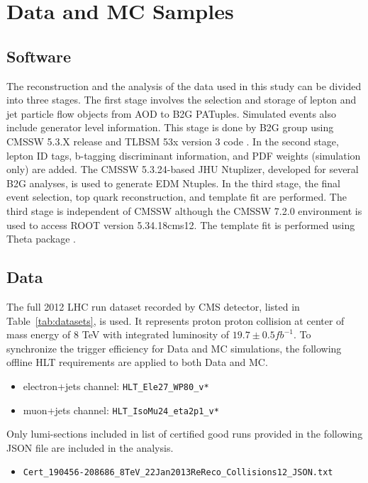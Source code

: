 \section{Data and MC Samples}
\label{sec:samples}

\subsection{Software}
The reconstruction and the analysis of the data used in this study can be divided into three stages.  The first stage involves the selection and storage of lepton and jet particle flow objects from AOD to B2G PATuples.  Simulated events also include generator level information.  This stage is done by B2G group using CMSSW 5.3.X release and TLBSM 53x version 3 code \cite{B2G_twiki}.  In the second stage, lepton ID tags, b-tagging discriminant information, and PDF weights (simulation only) are added.  The  CMSSW 5.3.24-based JHU Ntuplizer, developed for several B2G analyses, is used to generate EDM Ntuples.  In the third stage, the final event selection, top quark reconstruction, and template fit are performed. The third stage is independent of CMSSW although the CMSSW 7.2.0 environment is used to access ROOT version 5.34.18cms12. The template fit is performed using Theta package \cite{muller2010theta}.
  
\subsection{Data}
The full 2012 LHC run dataset recorded by CMS detector, listed in Table~\ref{tab:datasets}, is used.  It represents proton proton collision at center of mass energy of 8 TeV with integrated luminosity of $19.7 \pm 0.5 fb^{-1}$.  
To synchronize the trigger efficiency for Data and MC simulations, the following offline HLT requirements are applied to both Data and MC.
\begin{itemize}
\item electron+jets channel: \texttt{HLT\_Ele27\_WP80\_v*}
\item muon+jets channel: \texttt{HLT\_IsoMu24\_eta2p1\_v*}
\end{itemize}
Only lumi-sections included in list of certified good runs provided in the following JSON file are included in the analysis. 
\begin{itemize}
\item \texttt{Cert\_190456-208686\_8TeV\_22Jan2013ReReco\_Collisions12\_JSON.txt}
\end{itemize}

